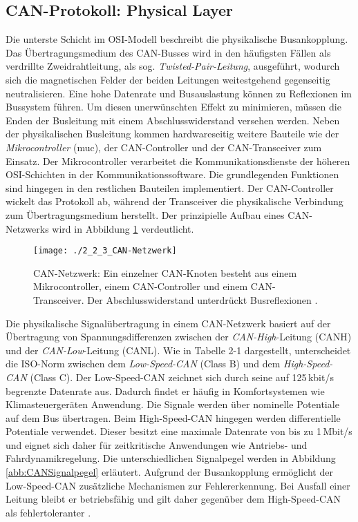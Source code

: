 \subsection{CAN-Protokoll: Physical Layer} \label{subsec:PhysicalLayer}
Die unterste Schicht im \acs{OSI}-Modell beschreibt die physikalische Busankopplung. Das Übertragungsmedium des \acs{CAN}-Busses wird in den häufigsten Fällen als verdrillte Zweidrahtleitung, als sog. \emph{Twisted-Pair-Leitung}, ausgeführt, wodurch sich die magnetischen Felder der beiden Leitungen weitestgehend gegenseitig neutralisieren. Eine hohe Datenrate und Busauslastung können zu Reflexionen im Bussystem führen. Um diesen unerwünschten Effekt zu minimieren, müssen die Enden der Busleitung mit einem Abschlusswiderstand versehen werden. Neben der physikalischen Busleitung kommen hardwareseitig weitere Bauteile wie der \emph{Mikrocontroller} (\acs{muc}), der \acs{CAN}-Controller und der \acs{CAN}-Transceiver zum Einsatz. Der Mikrocontroller verarbeitet die Kommunikationsdienste der höheren \acs{OSI}-Schichten in der Kommunikationssoftware. Die grundlegenden Funktionen sind hingegen in den restlichen Bauteilen implementiert. Der \acs{CAN}-Controller wickelt das Protokoll ab, während der Transceiver die physikalische Verbindung zum Übertragungsmedium herstellt. Der prinzipielle Aufbau eines \acs{CAN}-Netzwerks wird in Abbildung \ref{abb:CANNetzwerk} verdeutlicht.

\begin{figure}[!htbp]
	\centering
	\texttt{[image: ./2\_2\_3\_CAN-Netzwerk]}
	\caption{CAN-Netzwerk: Ein einzelner \acs{CAN}-Knoten besteht aus einem Mikrocontroller, einem \acs{CAN}-Controller und einem \acs{CAN}-Transceiver. Der Abschlusswiderstand unterdrückt	Busreflexionen \cite{Zimmermann.2014}.}
	\label{abb:CANNetzwerk}
\end{figure}

Die physikalische Signalübertragung in einem \acs{CAN}-Netzwerk basiert auf der Übertragung von Spannungsdifferenzen zwischen der \emph{\acs{CAN}-High}-Leitung (CANH) und der \emph{\acs{CAN}-Low}-Leitung (CANL). Wie in Tabelle 2-1 dargestellt, unterscheidet die \acs{ISO}-Norm zwischen dem \emph{Low-Speed-\acs{CAN}} (Class B) und dem \emph{High-Speed-\acs{CAN}} (Class C). Der Low-Speed-\acs{CAN} zeichnet sich durch seine auf 125\,kbit/s begrenzte Datenrate aus. Dadurch findet er häufig in Komfortsystemen wie Klimasteuergeräten Anwendung. Die Signale werden über nominelle Potentiale auf dem Bus übertragen. Beim High-Speed-\acs{CAN} hingegen werden differentielle Potentiale verwendet. Dieser besitzt eine maximale Datenrate von bis zu 1\,Mbit/s und eignet sich daher für zeitkritische Anwendungen wie Antriebs- und Fahrdynamikregelung. Die unterschiedlichen Signalpegel werden in Abbildung \ref{abb:CANSignalpegel} erläutert. Aufgrund der Busankopplung ermöglicht der Low-Speed-\acs{CAN} zusätzliche Mechanismen zur Fehlererkennung. Bei Ausfall einer Leitung bleibt er betriebsfähig und gilt daher gegenüber dem High-Speed-\acs{CAN} als fehlertoleranter \cite{Zimmermann.2014, VectorInformatikGmbH.}.

